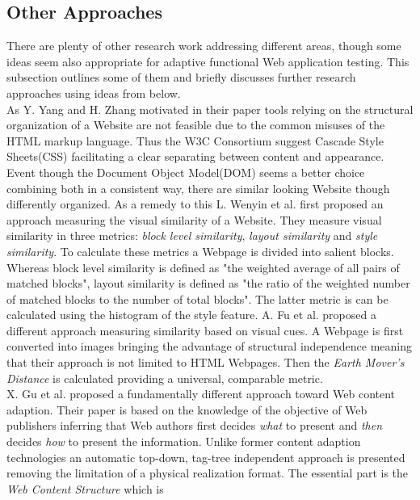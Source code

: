 \documentclass[12pt, notitlepage]{article}
\begin{document}
\subsection{Other Approaches}
There are plenty of other research work addressing different areas, though some ideas seem also appropriate for adaptive functional
Web application testing. This subsection outlines some of them and briefly discusses further research approaches using ideas from
below.\\
As Y. Yang and H. Zhang\cite{page-analysis_visual} motivated in their paper tools relying on the structural organization of a
Website are not feasible due to the common misuses of the HTML markup language. Thus the W3C Consortium suggest Cascade Style Sheets(CSS\cite{css3}) facilitating a clear separating between content and appearance. Event though the Document Object Model(DOM\cite{dom})
seems a better choice combining both in a consistent way, there are similar looking Website though differently organized.  
As a remedy to this L. Wenyin et al.\cite{phishing-visual} first proposed an approach measuring the visual similarity of a Website.
They measure visual similarity in three metrics: \textit{block level similarity}, \textit{layout similarity} and
\textit{style similarity}. To calculate these metrics a Webpage is divided into salient blocks. Whereas block level similarity is defined as "the weighted average of all pairs of matched blocks", layout similarity is defined as "the ratio of the weighted number
of matched blocks to the number of total blocks". The latter metric is can be calculated using the histogram of the style feature. 
A. Fu et al.\cite{emd} proposed a different approach measuring similarity based on visual cues. A Webpage is first converted into 
images bringing the advantage of structural independence meaning that their approach is not limited to HTML Webpages. Then the
\textit{Earth Mover's Distance}\cite{emd-def} is calculated providing a universal, comparable metric. \\
X. Gu et al.\cite{understanding-web-adaption} proposed a fundamentally different approach toward Web content adaption. 
Their paper is based on the knowledge of the objective of Web publishers inferring that Web authors first decides \textit{what}
to present and \textit{then} decides \textit{how} to present the information. Unlike former content adaption
technologies\cite{function-object-model, adaptive-html-delivery} an automatic top-down, tag-tree independent approach is presented
removing the limitation of a physical realization format. The essential part is the \textit{Web Content Structure} which is
\end{document}
